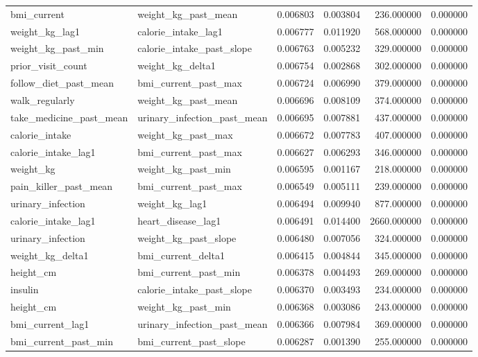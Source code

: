 \begin{longtable}{llrrrr}
bmi\_current & weight\_kg\_past\_mean & 0.006803 & 0.003804 & 236.000000 & 0.000000 \\
weight\_kg\_lag1 & calorie\_intake\_lag1 & 0.006777 & 0.011920 & 568.000000 & 0.000000 \\
weight\_kg\_past\_min & calorie\_intake\_past\_slope & 0.006763 & 0.005232 & 329.000000 & 0.000000 \\
prior\_visit\_count & weight\_kg\_delta1 & 0.006754 & 0.002868 & 302.000000 & 0.000000 \\
follow\_diet\_past\_mean & bmi\_current\_past\_max & 0.006724 & 0.006990 & 379.000000 & 0.000000 \\
walk\_regularly & weight\_kg\_past\_mean & 0.006696 & 0.008109 & 374.000000 & 0.000000 \\
take\_medicine\_past\_mean & urinary\_infection\_past\_mean & 0.006695 & 0.007881 & 437.000000 & 0.000000 \\
calorie\_intake & weight\_kg\_past\_max & 0.006672 & 0.007783 & 407.000000 & 0.000000 \\
calorie\_intake\_lag1 & bmi\_current\_past\_max & 0.006627 & 0.006293 & 346.000000 & 0.000000 \\
weight\_kg & weight\_kg\_past\_min & 0.006595 & 0.001167 & 218.000000 & 0.000000 \\
pain\_killer\_past\_mean & bmi\_current\_past\_max & 0.006549 & 0.005111 & 239.000000 & 0.000000 \\
urinary\_infection & weight\_kg\_lag1 & 0.006494 & 0.009940 & 877.000000 & 0.000000 \\
calorie\_intake\_lag1 & heart\_disease\_lag1 & 0.006491 & 0.014400 & 2660.000000 & 0.000000 \\
urinary\_infection & weight\_kg\_past\_slope & 0.006480 & 0.007056 & 324.000000 & 0.000000 \\
weight\_kg\_delta1 & bmi\_current\_delta1 & 0.006415 & 0.004844 & 345.000000 & 0.000000 \\
height\_cm & bmi\_current\_past\_min & 0.006378 & 0.004493 & 269.000000 & 0.000000 \\
insulin & calorie\_intake\_past\_slope & 0.006370 & 0.003493 & 234.000000 & 0.000000 \\
height\_cm & weight\_kg\_past\_min & 0.006368 & 0.003086 & 243.000000 & 0.000000 \\
bmi\_current\_lag1 & urinary\_infection\_past\_mean & 0.006366 & 0.007984 & 369.000000 & 0.000000 \\
bmi\_current\_past\_min & bmi\_current\_past\_slope & 0.006287 & 0.001390 & 255.000000 & 0.000000 \\

\end{longtable}
